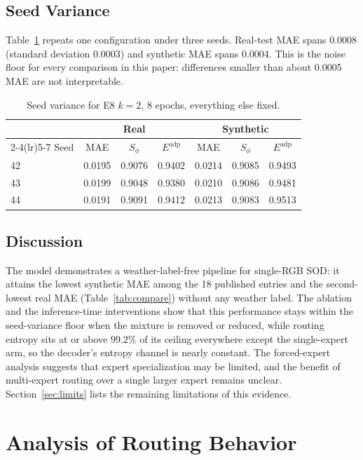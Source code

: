 \documentclass[10pt,a4paper,twocolumn,twoside]{article}
\begin{document}
\subsection{Seed Variance}
Table~\ref{tab:seeds} repeats one configuration under three seeds.
Real-test MAE spans 0.0008 (standard deviation 0.0003) and
synthetic MAE spans 0.0004.
This is the noise floor for every comparison in this paper: differences smaller than about
0.0005 MAE are not interpretable.


\begin{table}[tbp]
\centering
\caption{Seed variance for E8 $k{=}2$, 8 epochs, everything else fixed.}
\label{tab:seeds}
\footnotesize
\begin{tabular}{@{}lcccccc@{}}
\toprule
& \multicolumn{3}{c}{Real} & \multicolumn{3}{c}{Synthetic} \\
\cmidrule(lr){2-4}\cmidrule(lr){5-7}
Seed & MAE & $S_\phi$ & $E^{\text{adp}}$ & MAE & $S_\phi$ & $E^{\text{adp}}$ \\
\midrule
42 & 0.0195 & 0.9076 & 0.9402 & 0.0214 & 0.9085 & 0.9493 \\
43 & 0.0199 & 0.9048 & 0.9380 & 0.0210 & 0.9086 & 0.9481 \\
44 & 0.0191 & 0.9091 & 0.9412 & 0.0213 & 0.9083 & 0.9513 \\
\bottomrule
\end{tabular}
\end{table}


\subsection{Discussion}
The model demonstrates a weather-label-free pipeline for single-RGB SOD: it attains the lowest
synthetic MAE among the 18 published entries and the second-lowest real MAE (Table~\ref{tab:compare}) without any weather
label. The ablation and the inference-time interventions show that this performance stays
within the seed-variance floor when the mixture is removed or reduced, while
routing entropy sits at or above $99.2\%$ of its ceiling everywhere except the single-expert
arm, so the decoder's entropy channel is nearly constant. The forced-expert analysis suggests that expert specialization may be
limited, and the benefit of multi-expert routing over a single larger expert remains unclear.
Section~\ref{sec:limits} lists the remaining limitations of this evidence.

\section{Analysis of Routing Behavior}
\label{sec:why}
\end{document}
